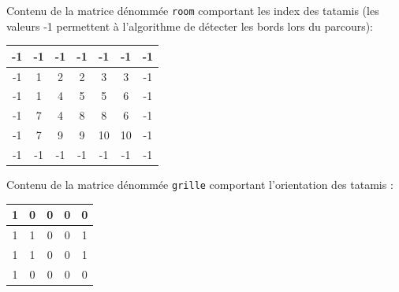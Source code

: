 \setlength{\columnseprule}{1pt}
\setlength{\columnsep}{1cm}
\begin{multicols}{2}

    Contenu de la matrice dénommée \texttt{room} comportant les index des tatamis (les valeurs -1 permettent à l’algorithme de détecter les bords lors du parcours):

    \begin{center}
        \begin{tabular}{|c |c |c |c |c |c |c |} \hline
            -1 & -1                    & -1                         & -1                         & -1                          & -1                          & -1 \\ \hline
            -1 & \cellcolor{tsyellow}1 & \cellcolor{tsforestgreen}2 & \cellcolor{tsforestgreen}2 & \cellcolor{tsforestgreen}3  & \cellcolor{tsforestgreen}3  & -1 \\ \hline
            -1 & \cellcolor{tsyellow}1 & \cellcolor{tsyellow}4      & \cellcolor{tsforestgreen}5 & \cellcolor{tsforestgreen}5  & \cellcolor{tsyellow}6       & -1 \\ \hline
            -1 & \cellcolor{tsyellow}7 & \cellcolor{tsyellow}4      & \cellcolor{tsforestgreen}8 & \cellcolor{tsforestgreen}8  & \cellcolor{tsyellow}6       & -1 \\ \hline
            -1 & \cellcolor{tsyellow}7 & \cellcolor{tsforestgreen}9 & \cellcolor{tsforestgreen}9 & \cellcolor{tsforestgreen}10 & \cellcolor{tsforestgreen}10 & -1 \\ \hline
            -1 & -1                    & -1                         & -1                         & -1                          & -1                          & -1 \\ \hline
        \end{tabular}

    \end{center}
   
    \columnbreak

    Contenu de la matrice dénommée \texttt{grille} comportant l’orientation des tatamis :
  
    \begin{center}
       
        \begin{tabular}{|c |c |c |c |c |} \hline
        \cellcolor{tsyellow}1 & \cellcolor{tsforestgreen}0 & \cellcolor{tsforestgreen}0 & \cellcolor{tsforestgreen}0 & \cellcolor{tsforestgreen}0 \\ \hline
        \cellcolor{tsyellow}1 & \cellcolor{tsyellow}1      & \cellcolor{tsforestgreen}0 & \cellcolor{tsforestgreen}0 & \cellcolor{tsyellow}1      \\ \hline
        \cellcolor{tsyellow}1 & \cellcolor{tsyellow}1      & \cellcolor{tsforestgreen}0 & \cellcolor{tsforestgreen}0 & \cellcolor{tsyellow}1      \\ \hline
        \cellcolor{tsyellow}1 & \cellcolor{tsforestgreen}0 & \cellcolor{tsforestgreen}0 & \cellcolor{tsforestgreen}0 & \cellcolor{tsforestgreen}0 \\ \hline
    \end{tabular}
    \end{center}


\end{multicols}
